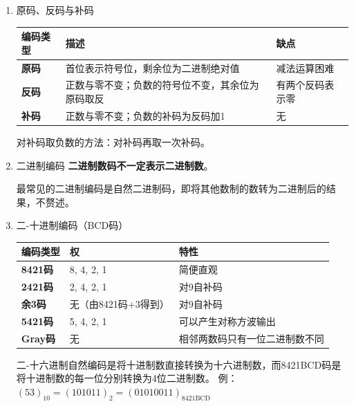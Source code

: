 \documentclass[UTF8,fontset=fandol,zihao=5]{ctexart}
\begin{document}
\begin{enumerate}
  \item 原码、反码与补码
  \begin{center}
    \begin{tabularx}{0.92\textwidth}{>{\bfseries}p{1.5cm} >{}p{9.5cm} X}
      \toprule
      编码类型 & 描述 & 缺点 \\
      \midrule
      原码 & 首位表示符号位，剩余位为二进制绝对值 & 减法运算困难 \\
      反码 & 正数与零不变；负数的符号位不变，其余位为原码取反 & 有两个反码表示零 \\
      补码 & 正数与零不变；负数的补码为反码加1 & 无 \\
      \bottomrule
    \end{tabularx}
  \end{center}

  \begin{methodbox}[补码取负]
    对补码取负数的方法：对补码再取一次补码。
  \end{methodbox}

  \item 二进制编码
  \textbf{二进制数码不一定表示二进制数}。

  最常见的二进制编码是自然二进制码，即将其他数制的数转为二进制后的结果，不赘述。

  \item 二-十进制编码（BCD码）
  \begin{center}
    \begin{tabularx}{0.92\textwidth}{>{\bfseries}p{2.5cm}X X}
      \toprule
      编码类型 & 权 & 特性 \\
      \midrule
      8421码 & 8, 4, 2, 1 & 简便直观 \\
      2421码 & 2, 4, 2, 1 & 对9自补码 \\
      余3码 & 无（由8421码+3得到） & 对9自补码 \\
      5421码 & 5, 4, 2, 1 & 可以产生对称方波输出 \\
      Gray码 & 无 & 相邻两数码只有一位二进制数不同 \\
      \bottomrule
    \end{tabularx}
  \end{center}

  \begin{methodbox}
    二-十六进制自然编码是将十进制数直接转换为十六进制数，而8421BCD码是将十进制数的每一位分别转换为4位二进制数。
    例：
    $(53)_{10} = (101011)_{2} = (01010011)_{8421\text{BCD}}$
  \end{methodbox}


\end{enumerate}
\end{document}
